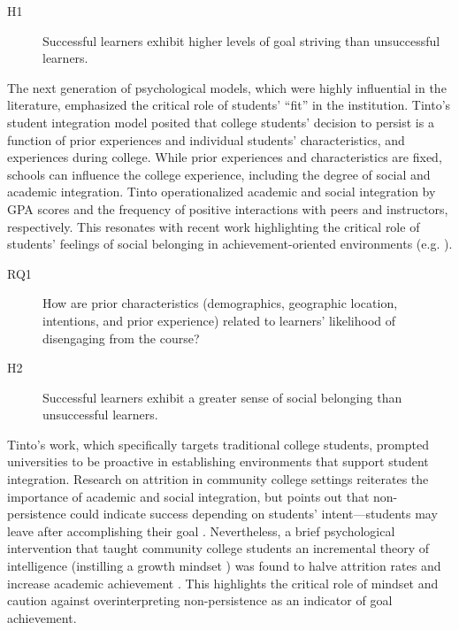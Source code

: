\documentclass{sigchi}\usepackage[]{graphicx}\usepackage[]{color}
\begin{document}
\begin{description}
  \item[H1] Successful learners exhibit higher levels of goal striving than unsuccessful learners.
\end{description}

The next generation of psychological models, which were highly influential in the literature, emphasized the critical role of students' ``fit'' in the institution. Tinto's \citeyear{tinto1975dropout} student integration model posited that college students' decision to persist is a function of prior experiences and individual students' characteristics, and experiences during college. While prior experiences and characteristics are fixed, schools can influence the college experience, including the degree of social and academic integration. Tinto operationalized academic and social integration by GPA scores and the frequency of positive interactions with peers and instructors, respectively. This resonates with recent work highlighting the critical role of students' feelings of social belonging in achievement-oriented environments (e.g. \cite{walton2007question}). 

\begin{description}
  \item[RQ1] How are prior characteristics (demographics, geographic location, intentions, and prior experience) related to learners' likelihood of disengaging from the course?
  \item[H2] Successful learners exhibit a greater sense of social belonging than unsuccessful learners.
\end{description}

Tinto's work, which specifically targets traditional college students, prompted universities to be proactive in establishing environments that support student integration. Research on attrition in community college settings reiterates the importance of academic and social integration, but points out that non-persistence could indicate success depending on students' intent---students may leave after accomplishing their goal \cite{bers1991persistence}. Nevertheless, a brief psychological intervention that taught community college students an incremental theory of intelligence (instilling a growth mindset \cite{dweck2006mindset}) was found to halve attrition rates and increase academic achievement \cite{paunesku2012brief}. This highlights the critical role of mindset and caution against overinterpreting non-persistence as an indicator of goal achievement.
\end{document}
